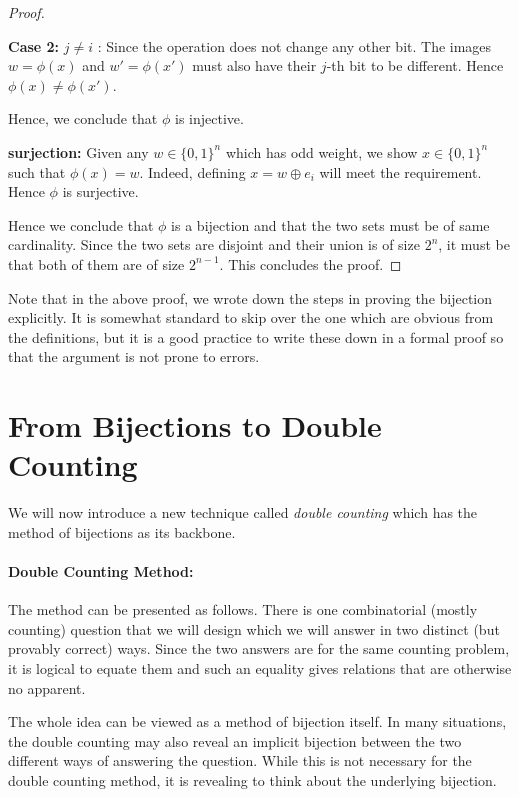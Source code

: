 \begin{proof}
\begin{description}
\begin{description}
\item{{\bf Case 2:} $j \ne i$ :} Since the operation does not change any other bit. The images $w = \phi(x)$ and $w' = \phi(x')$ must also have their $j$-th bit to  be different. Hence $\phi(x) \ne \phi(x')$.
\end{description}
Hence, we conclude that $\phi$ is injective.
\item{\bf surjection:} Given any $w \in \{0,1\}^n$ which has odd weight, we show $x \in \{0,1\}^n$ such that $\phi(x) = w$. Indeed, defining $x = w \oplus e_i$ will meet the requirement. Hence $\phi$ is surjective.
\end{description}
Hence we conclude that $\phi$ is a bijection and that the two sets must be of same cardinality. Since the two sets are disjoint and their union is of size $2^n$, it must be that both of them are of size $2^{n-1}$. This concludes the proof.
\end{proof}

Note that in the above proof, we wrote down the steps in proving the bijection explicitly. It is somewhat standard to skip over the one which are obvious from the definitions, but it is a good practice to write these down in a formal proof so that the argument is not prone to errors.

\section{From Bijections to Double Counting}

We will now introduce a new technique called {\em double counting} which has the method of bijections as its backbone. 

\paragraph{Double Counting Method:} The method can be presented as follows. There is one combinatorial (mostly counting) question that we will design which we will answer in two distinct (but provably correct) ways. Since the two answers are for the same counting problem, it is logical to equate them and such an equality gives relations that are otherwise no apparent. 

The whole idea can be viewed as a method of bijection itself. In many situations, the double counting may also reveal an implicit bijection between the two different ways of answering the question. While this is not necessary for the double counting method, it is revealing to think about the underlying bijection.

